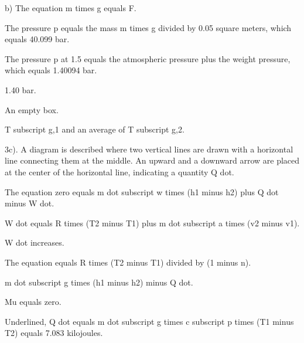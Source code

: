 b)
The equation m times g equals F.

The pressure p equals the mass m times g divided by 0.05 square meters, which equals 40.099 bar.

The pressure p at 1.5 equals the atmospheric pressure plus the weight pressure, which equals 1.40094 bar.

1.40 bar.

An empty box.

T subscript g,1 and an average of T subscript g,2.

3c).
A diagram is described where two vertical lines are drawn with a horizontal line connecting them at the middle. An upward and a downward arrow are placed at the center of the horizontal line, indicating a quantity Q dot.

The equation zero equals m dot subscript w times (h1 minus h2) plus Q dot minus W dot.

W dot equals R times (T2 minus T1) plus m dot subscript a times (v2 minus v1).

W dot increases.

The equation equals R times (T2 minus T1) divided by (1 minus n).

m dot subscript g times (h1 minus h2) minus Q dot.

Mu equals zero.

Underlined, Q dot equals m dot subscript g times c subscript p times (T1 minus T2) equals 7.083 kilojoules.